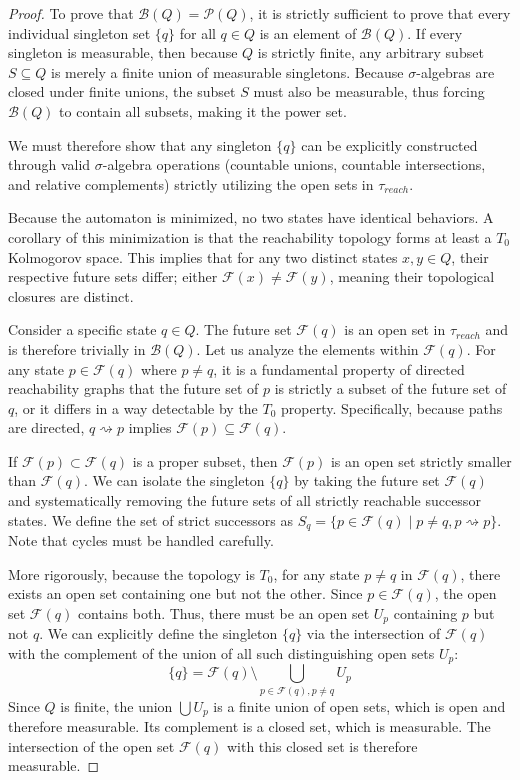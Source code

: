 \begin{proof}
To prove that $\mathcal{B}(Q) = \mathcal{P}(Q)$, it is strictly sufficient to prove that every individual singleton set $\{q\}$ for all $q \in Q$ is an element of $\mathcal{B}(Q)$. If every singleton is measurable, then because $Q$ is strictly finite, any arbitrary subset $S \subseteq Q$ is merely a finite union of measurable singletons. Because $\sigma$-algebras are closed under finite unions, the subset $S$ must also be measurable, thus forcing $\mathcal{B}(Q)$ to contain all subsets, making it the power set.

We must therefore show that any singleton $\{q\}$ can be explicitly constructed through valid $\sigma$-algebra operations (countable unions, countable intersections, and relative complements) strictly utilizing the open sets in $\tau_{reach}$.

Because the automaton is minimized, no two states have identical behaviors. A corollary of this minimization is that the reachability topology forms at least a $T_0$ Kolmogorov space. This implies that for any two distinct states $x, y \in Q$, their respective future sets differ; either $\mathcal{F}(x) \neq \mathcal{F}(y)$, meaning their topological closures are distinct.

Consider a specific state $q \in Q$. The future set $\mathcal{F}(q)$ is an open set in $\tau_{reach}$ and is therefore trivially in $\mathcal{B}(Q)$. 
Let us analyze the elements within $\mathcal{F}(q)$. For any state $p \in \mathcal{F}(q)$ where $p \neq q$, it is a fundamental property of directed reachability graphs that the future set of $p$ is strictly a subset of the future set of $q$, or it differs in a way detectable by the $T_0$ property. Specifically, because paths are directed, $q \rightsquigarrow p$ implies $\mathcal{F}(p) \subseteq \mathcal{F}(q)$. 

If $\mathcal{F}(p) \subset \mathcal{F}(q)$ is a proper subset, then $\mathcal{F}(p)$ is an open set strictly smaller than $\mathcal{F}(q)$. 
We can isolate the singleton $\{q\}$ by taking the future set $\mathcal{F}(q)$ and systematically removing the future sets of all strictly reachable successor states. We define the set of strict successors as $S_q = \{ p \in \mathcal{F}(q) \mid p \neq q, p \rightsquigarrow p \}$. Note that cycles must be handled carefully. 

More rigorously, because the topology is $T_0$, for any state $p \neq q$ in $\mathcal{F}(q)$, there exists an open set containing one but not the other. Since $p \in \mathcal{F}(q)$, the open set $\mathcal{F}(q)$ contains both. Thus, there must be an open set $U_p$ containing $p$ but not $q$.
We can explicitly define the singleton $\{q\}$ via the intersection of $\mathcal{F}(q)$ with the complement of the union of all such distinguishing open sets $U_p$:
\[
\{q\} = \mathcal{F}(q) \setminus \bigcup_{p \in \mathcal{F}(q), p \neq q} U_p
\]
Since $Q$ is finite, the union $\bigcup U_p$ is a finite union of open sets, which is open and therefore measurable. Its complement is a closed set, which is measurable. The intersection of the open set $\mathcal{F}(q)$ with this closed set is therefore measurable. 


\end{proof}
